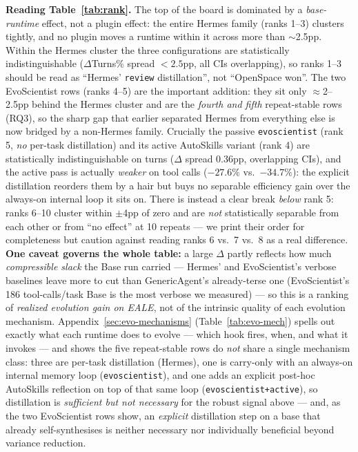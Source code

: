 \documentclass{article}
\begin{document}
\textbf{Reading Table~\ref{tab:rank}.} The top of the board is dominated by a \emph{base-runtime} effect, not a plugin effect: the entire Hermes family (ranks 1--3) clusters tightly, and no plugin moves a runtime within it across more than $\sim$2.5pp. Within the Hermes cluster the three configurations are statistically indistinguishable ($\Delta$Turns\% spread $<2.5$pp, all CIs overlapping), so ranks 1--3 should be read as ``Hermes' \texttt{review} distillation'', not ``OpenSpace won''. The two EvoScientist rows (ranks 4--5) are the important addition: they sit only $\approx$2--2.5pp behind the Hermes cluster and are the \emph{fourth and fifth} repeat-stable rows (RQ3), so the sharp gap that earlier separated Hermes from everything else is now bridged by a non-Hermes family. Crucially the passive \texttt{evoscientist} (rank 5, \emph{no} per-task distillation) and its active AutoSkills variant (rank 4) are statistically indistinguishable on turns ($\Delta$ spread $0.36$pp, overlapping CIs), and the active pass is actually \emph{weaker} on tool calls ($-27.6\%$ vs.\ $-34.7\%$): the explicit distillation reorders them by a hair but buys no separable efficiency gain over the always-on internal loop it sits on. There is instead a clear break \emph{below} rank 5: ranks 6--10 cluster within $\pm$4pp of zero and are \emph{not} statistically separable from each other or from ``no effect'' at 10 repeats --- we print their order for completeness but caution against reading ranks 6 vs.\ 7 vs.\ 8 as a real difference. \textbf{One caveat governs the whole table:} a large $\Delta$ partly reflects how much \emph{compressible slack} the Base run carried --- Hermes' and EvoScientist's verbose baselines leave more to cut than GenericAgent's already-terse one (EvoScientist's 186 tool-calls/task Base is the most verbose we measured) --- so this is a ranking of \emph{realized evolution gain on EALE}, not of the intrinsic quality of each evolution mechanism. Appendix~\ref{sec:evo-mechanisms} (Table~\ref{tab:evo-mech}) spells out exactly what each runtime does to evolve --- which hook fires, when, and what it invokes --- and shows the five repeat-stable rows do \emph{not} share a single mechanism class: three are per-task distillation (Hermes), one is carry-only with an always-on internal memory loop (\texttt{evoscientist}), and one adds an explicit post-hoc AutoSkills reflection on top of that same loop (\texttt{evoscientist+active}), so distillation is \emph{sufficient but not necessary} for the robust signal above --- and, as the two EvoScientist rows show, an \emph{explicit} distillation step on a base that already self-synthesises is neither necessary nor individually beneficial beyond variance reduction.
\end{document}
